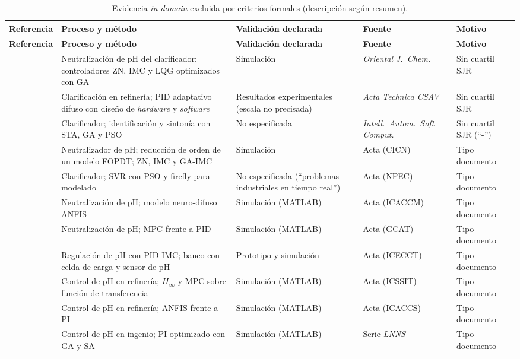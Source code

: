 \singlespacing\scriptsize
\begin{longtable}{>{\raggedright\arraybackslash}p{3.0cm} >{\raggedright\arraybackslash}p{4.6cm} >{\raggedright\arraybackslash}p{2.5cm} >{\raggedright\arraybackslash}p{2.8cm} >{\raggedright\arraybackslash}p{1.9cm}}
\caption{Evidencia \textit{in-domain} excluida por criterios formales
(descripción según resumen).}\label{tab:complementaria}\\
\toprule
\textbf{Referencia} & \textbf{Proceso y método} & \textbf{Validación declarada} & \textbf{Fuente} & \textbf{Motivo} \\
\midrule
\endfirsthead
\toprule
\textbf{Referencia} & \textbf{Proceso y método} & \textbf{Validación declarada} & \textbf{Fuente} & \textbf{Motivo} \\
\midrule
\endhead
\bottomrule
\endfoot
\cite{sunori2016ga} & Neutralización de pH del clarificador; controladores ZN, IMC y LQG optimizados con GA & Simulación & \textit{Oriental J.\ Chem.} & Sin cuartil SJR \\
\cite{wang2017ph} & Clarificación en refinería; PID adaptativo difuso con diseño de \textit{hardware} y \textit{software} & Resultados experimentales (escala no precisada) & \textit{Acta Technica CSAV} & Sin cuartil SJR \\
\cite{rajalakshmi2022machine} & Clarificador; identificación y sintonía con STA, GA y PSO & No especificada & \textit{Intell.\ Autom.\ Soft Comput.} & Sin cuartil SJR (``-'') \\
\cite{sunori2017model} & Neutralizador de pH; reducción de orden de un modelo FOPDT; ZN, IMC y GA-IMC & Simulación & Acta (CICN) & Tipo documento \\
\cite{rajalakshmi2018hybrid} & Clarificador; SVR con PSO y firefly para modelado & No especificada (``problemas industriales en tiempo real'') & Acta (NPEC) & Tipo documento \\
\cite{sunori2020neurofuzzy} & Neutralización de pH; modelo neuro-difuso ANFIS & Simulación (MATLAB) & Acta (ICACCM) & Tipo documento \\
\cite{jethi2021prediction} & Neutralización de pH; MPC frente a PID & Simulación (MATLAB) & Acta (GCAT) & Tipo documento \\
\cite{kdt2021sensor} & Regulación de pH con PID-IMC; banco con celda de carga y sensor de pH & Prototipo y simulación & Acta (ICECCT) & Tipo documento \\
\cite{sunori2022digital} & Control de pH en refinería; $H_\infty$ y MPC sobre función de transferencia & Simulación (MATLAB) & Acta (ICSSIT) & Tipo documento \\
\cite{sunori2022neurofuzzy} & Control de pH en refinería; ANFIS frente a PI & Simulación (MATLAB) & Acta (ICACCS) & Tipo documento \\
\cite{sunori2022soft} & Control de pH en ingenio; PI optimizado con GA y SA & Simulación (MATLAB) & Serie \textit{LNNS} & Tipo documento \\
\end{longtable}
\doublespacing

